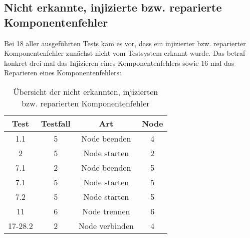 \subsection{Nicht erkannte, injizierte bzw. reparierte Komponentenfehler}
\label{subsec:notDetectedFaults}

Bei 18 aller ausgeführten Tests kam es vor, dass ein injizierter bzw. reparierter Komponentenfehler zunächst nicht vom Testsystem erkannt wurde.
Das betraf konkret drei mal das Injizieren eines Komponentenfehlers sowie 16 mal das Reparieren eines Komponentenfehlers:

\begin{table}[h]
    \begin{tabular}{c|ccc}
    	 Test   & Testfall &      Art       & Node \\ \hline
    	  1.1   &    5     &  Node beenden  &  4   \\
    	   2    &    5     &  Node starten  &  2   \\
    	  7.1   &    2     &  Node beenden  &  5   \\
    	  7.1   &    5     &  Node starten  &  5   \\
    	  7.2   &    5     &  Node starten  &  5   \\
    	  11    &    6     &  Node trennen  &  6   \\
    	17-28.2 &    2     & Node verbinden &  4
    \end{tabular} 
    \caption[Übersicht der nicht erkannten, injizierten/reparierten Komponentenfehler]
    {Übersicht der nicht erkannten, injizierten bzw. reparierten Komponentenfehler}
    \label{tab:notDetectedFaults}
\end{table}

